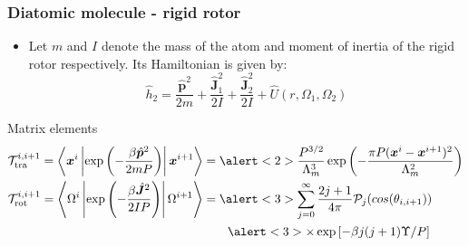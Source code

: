 \documentclass[xcolor=svgnames]{beamer}
\DeclareRobustCommand{\mc}[1]{\mathcal{#1}}
\DeclareRobustCommand{\mbf}[1]{{\boldsymbol {#1}}}
\begin{document}
        \begin{frame}
            \frametitle{Diatomic molecule - rigid rotor}
            \begin{itemize}
                \item Let $m$ and $I$ denote the mass of the atom and moment of inertia of the rigid rotor respectively. Its Hamiltonian is given by:
                    \begin{equation*}
                    \label{eq:hDiatomic}
                        \hat{h}_2 = \displaystyle\frac{\hat{\mbf{p}}^2}{2m} + \frac{\hat{\mbf{J}}_1^2}{2I} + \frac{\hat{\mbf{J}}_2^2}{2I} + \hat{U}(r,\Omega_1,\Omega_2)
                    \end{equation*}
            \end{itemize}
            \begin{block}{Matrix elements}
                \begin{equation*}
                    \begin{aligned}
                        \mc{T}^{i,i+1}_{\text{tra}} = \left< \mbf{x}^i \left| \exp \left(-\displaystyle\frac{\beta \hat{\mbf{p}}^2}{2 m P} \right) \right| \mbf{x}^{i+1} \right> &= \alert<2>{\displaystyle\frac{P^{3/2}}{\Lambda_m^3} \exp \left(-\displaystyle\frac{\pi P (\mbf{x}^i - \mbf{x}^{i+1})^2}{\Lambda_m^2}\right)}\\
                        \mc{T}^{i,i+1}_{\text{rot}} = \left< \Omega^i \left| \exp \left(-\displaystyle\frac{\beta \hat{\mbf{J}}^2}{2IP} \right) \right| \Omega^{i+1} \right> &= \alert<3>{\displaystyle\sum_{j=0}^\infty \frac{2j+1}{4 \pi} \mc{P}_j (cos (\theta_{i,i+1}))}\\
                        &\qquad \alert<3>{\times \exp \left[-\beta j(j+1) \Upsilon/ P \right]}
                    \end{aligned}
                \end{equation*}
            \end{block}
        \end{frame}
\end{document}
